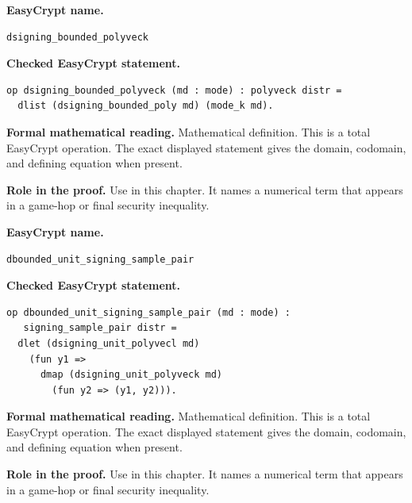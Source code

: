 \begin{formaldefinition}
\noindent\textbf{EasyCrypt name.}
\begin{lstlisting}[language=EasyCrypt,basicstyle=\ttfamily\scriptsize]
dsigning_bounded_polyveck
\end{lstlisting}
\noindent\textbf{Checked EasyCrypt statement.}
\begin{lstlisting}[language=EasyCrypt,basicstyle=\ttfamily\scriptsize]
op dsigning_bounded_polyveck (md : mode) : polyveck distr =
  dlist (dsigning_bounded_poly md) (mode_k md).
\end{lstlisting}
\noindent\textbf{Formal mathematical reading.}
Mathematical definition. This is a total EasyCrypt operation.  The exact displayed statement gives the domain, codomain, and defining equation when present.

\noindent\textbf{Role in the proof.}
Use in this chapter. It names a numerical term that appears in a game-hop or final security inequality.

\end{formaldefinition}

\begin{formaldefinition}
\noindent\textbf{EasyCrypt name.}
\begin{lstlisting}[language=EasyCrypt,basicstyle=\ttfamily\scriptsize]
dbounded_unit_signing_sample_pair
\end{lstlisting}
\noindent\textbf{Checked EasyCrypt statement.}
\begin{lstlisting}[language=EasyCrypt,basicstyle=\ttfamily\scriptsize]
op dbounded_unit_signing_sample_pair (md : mode) :
   signing_sample_pair distr =
  dlet (dsigning_unit_polyvecl md)
    (fun y1 =>
      dmap (dsigning_unit_polyveck md)
        (fun y2 => (y1, y2))).
\end{lstlisting}
\noindent\textbf{Formal mathematical reading.}
Mathematical definition. This is a total EasyCrypt operation.  The exact displayed statement gives the domain, codomain, and defining equation when present.

\noindent\textbf{Role in the proof.}
Use in this chapter. It names a numerical term that appears in a game-hop or final security inequality.

\end{formaldefinition}


